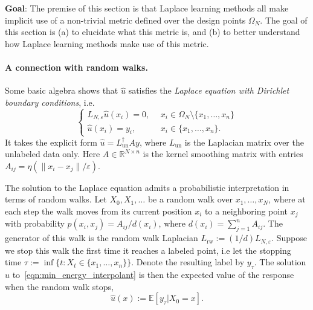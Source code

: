 \documentclass{article}
\newcommand{\Reals}{\mathbb{R}}
\newcommand{\1}{\mathbf{1}}
\newcommand{\Ebb}{\mathbb{E}}
\newcommand{\wh}[1]{\widehat{#1}}
\theoremstyle{definition}
\theoremstyle{remark}
\begin{document}
\textbf{Goal}: The premise of this section is that Laplace learning methods all make implicit use of a non-trivial metric defined over the design points $\Omega_N$. The goal of this section is (a) to elucidate what this metric is, and (b) to better understand how Laplace learning methods make use of this metric. 

\paragraph{A connection with random walks.}

Some basic algebra shows that $\wh{u}$ satisfies the \emph{Laplace equation with Dirichlet boundary conditions}, i.e. 
\begin{equation}
\label{eqn:laplace_equation}
\begin{cases}
L_{N,\varepsilon}{\wh{u}}(x_i) = 0,& ~~\textrm{$x_i \in \Omega_N \setminus \{x_1,\ldots,x_n\}$} \\
\wh{u}(x_i) = y_i,&~~\textrm{$x_i \in \{x_1,\ldots,x_n\}$.}
\end{cases}
\end{equation}
It takes the explicit form $\wh{u} = L_{\mathrm{un}}^{\dagger} A y$, where $L_{\mathrm{un}}$ is the Laplacian matrix over the unlabeled data only. Here $A \in \Reals^{N \times n}$ is the kernel smoothing matrix with entries $A_{ij} = \eta(\|x_i - x_j\| / \varepsilon)$.

The solution to the Laplace equation admits a probabilistic interpretation in terms of random walks. Let $X_0,X_1,\ldots$ be a random walk over $x_1,\ldots,x_N$, where at each step the walk moves from its current position $x_i$ to a neighboring point $x_j$ with probability $p(x_i,x_j) = A_{ij}/d(x_i)$, where $d(x_i) = \sum_{j = 1}^{n} A_{ij}$. The generator of this walk is the random walk Laplacian $L_{\mathrm{rw}} := (1/d) L_{N,\varepsilon}$. Suppose we stop this walk the first time it reaches a labeled point, i.e let the stopping time $\tau := \inf\{t: X_t \in \{x_1,\ldots,x_n\}\}$. Denote the resulting label by $y_{\tau}$. The solution $\wh{u}$ to~\eqref{eqn:min_energy_interpolant} is then the expected value of the response when the random walk stops,
\begin{equation}
\label{eqn:random_walk_interpretation_laplace_learning}
\wh{u}(x) := \Ebb[y_{\tau}|X_0 = x].
\end{equation}
\end{document}
